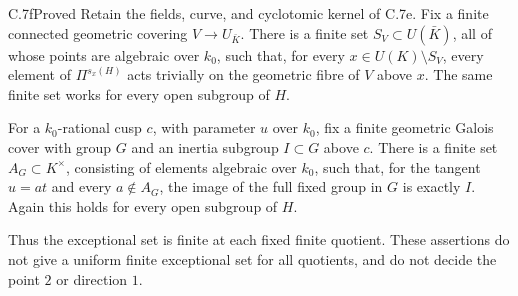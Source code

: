 \begin{claim}{C.7f}{Proved}
Retain the fields, curve, and cyclotomic kernel of C.7e. Fix a finite
connected geometric covering $V\to U_{\bar K}$. There is a finite set
$S_V\subset U(\bar K)$, all of whose points are algebraic over $k_0$,
such that, for every $x\in U(K)\setminus S_V$, every element of
$\Pi^{s_x(H)}$ acts trivially on the geometric fibre of $V$ above $x$.
The same finite set works for every open subgroup of $H$.

For a $k_0$-rational cusp $c$, with parameter $u$ over $k_0$, fix a
finite geometric Galois cover with group $G$ and an inertia subgroup
$I\subset G$ above $c$. There is a finite set
$A_G\subset K^\times$, consisting of elements algebraic over $k_0$,
such that, for the tangent $u=a t$ and every $a\notin A_G$, the
image of the full fixed group in $G$ is exactly $I$.
Again this holds for every open subgroup of $H$.

Thus the exceptional set is finite at each fixed finite quotient.
These assertions do not give a uniform finite exceptional set for
all quotients, and do not decide the point $2$ or direction $1$.
\end{claim}
